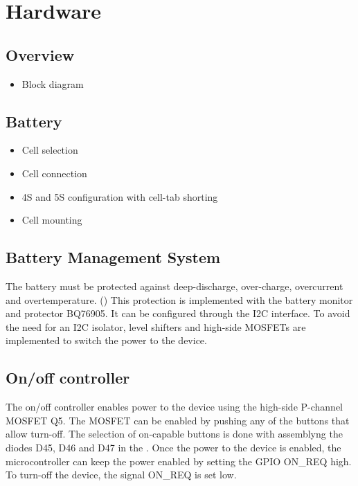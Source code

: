 \section{Hardware}

\FloatBarrier

\subsection{Overview}
\label{sec_hw_overview}
\begin{itemize}
    \item Block diagram
\end{itemize}

\FloatBarrier

\subsection{Battery}
\label{sec_battery}
\begin{itemize}
    \item Cell selection
    \item Cell connection
    \item 4S and 5S configuration with cell-tab shorting
    \item Cell mounting
\end{itemize}

\subsection{Battery Management System}
\label{sec_bms}
The battery must be protected against deep-discharge, over-charge, overcurrent and overtemperature. ()
This protection is implemented with the battery monitor and protector BQ76905. It can be configured through the \ac{I2C} interface. To avoid the need for an \ac{I2C} isolator, level shifters and high-side \acp{MOSFET} are implemented to switch the power to the device. 

\FloatBarrier

\subsection{On/off controller}
\label{sec_onoff}
The on/off controller enables power to the device using the high-side P-channel \ac{MOSFET} Q5. The \ac{MOSFET} can be enabled by pushing any of the buttons that allow turn-off. The selection of on-capable buttons is done with assemblyng the diodes D45, D46 and D47 in the . Once the power to the device is enabled, the microcontroller can keep the power enabled by setting the \ac{GPIO} ON\_REQ high. To turn-off the device, the signal ON\_REQ is set low. 

